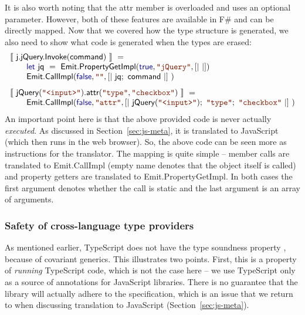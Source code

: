\documentclass[submission,copyright,creativecommons]{eptcs}
\newcommand{\sem}[1]{\llbracket #1 \rrbracket}
\newcommand{\kvd}[1]{\textnormal{\textcolor{kvdclr}{\sffamily #1}}}
\newcommand{\str}[1]{\textnormal{\textcolor{strclr}{\ttfamily "#1"}}}
\newcommand{\ident}[1]{\textnormal{\sffamily #1}}
\begin{document}
\noindent
It is also worth noting that the \ident{attr} member is overloaded and uses an optional parameter.
However, both of these features are available in F\# and can be directly mapped. Now that we
covered how the type structure is generated, we also need to show what code is generated when
the types are erased:
%
\begin{equation*}
\begin{array}{l}
 \sem{~\ident{j.jQuery.Invoke}(\ident{command})~} ~= \\
 \qquad \kvd{let}~\ident{jq}~=~\ident{Emit.PropertyGetImpl}(\kvd{true}, \str{jQuery}, \lbrack|~|\rbrack) \\
 \qquad \ident{Emit.CallImpl}(\kvd{false}, \str{}, \lbrack|~ \ident{jq};~ \ident{command}~|\rbrack~) \\[0.75em]
 \sem{~\ident{jQuery}(\str{<input>})\ident{.attr}(\str{type},\str{checkbox})~} ~= \\
 \qquad \ident{Emit.CallImpl}(\kvd{false}, \str{attr}, \lbrack|~ \ident{jQuery}(\str{<input>});~\str{type};~\str{checkbox}~|\rbrack~)
\end{array}
\end{equation*}
%
An important point here is that the above provided code is never actually \emph{executed}.
As discussed in Section~\ref{sec:js-meta}, it is translated to JavaScript (which then runs
in the web browser). So, the above code can be seen more as instructions for the translator.
The mapping is quite simple -- member calls are translated to \ident{Emit.CallImpl} (empty
name denotes that the object itself is called) and property getters are translated to
\ident{Emit.PropertyGetImpl}. In both cases the first argument denotes whether the call is
static and the last argument is an array of arguments.

\subsubsection{Safety of cross-language type providers}
As mentioned earlier, TypeScript does not have the type soundness property \cite{ms-safets},
because of covariant generics. This illustrates two points. First, this is a property of
\emph{running} TypeScript code, which is not the case here -- we use TypeScript only as a
source of annotations for JavaScript libraries. There is no guarantee that the library will
actually adhere to the specification, which is an issue that we return to when discussing
translation to JavaScript (Section~\ref{sec:js-meta}).
\end{document}
